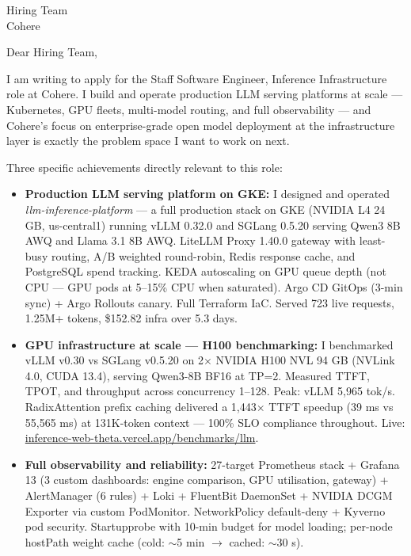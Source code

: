 \documentclass[a4paper]{letter}
\date{\today}
\begin{document}
\begin{letter}{Hiring Team \\ Cohere}

\opening{Dear Hiring Team,}

I am writing to apply for the Staff Software Engineer, Inference Infrastructure role at Cohere. I build and operate production LLM serving platforms at scale — Kubernetes, GPU fleets, multi-model routing, and full observability — and Cohere's focus on enterprise-grade open model deployment at the infrastructure layer is exactly the problem space I want to work on next.

Three specific achievements directly relevant to this role:

\begin{itemize}
  \item \textbf{Production LLM serving platform on GKE:} I designed and operated \textit{llm-inference-platform} — a full production stack on GKE (NVIDIA L4 24 GB, us-central1) running vLLM 0.32.0 and SGLang 0.5.20 serving Qwen3 8B AWQ and Llama 3.1 8B AWQ. LiteLLM Proxy 1.40.0 gateway with least-busy routing, A/B weighted round-robin, Redis response cache, and PostgreSQL spend tracking. KEDA autoscaling on GPU queue depth (not CPU — GPU pods at 5--15\% CPU when saturated). Argo CD GitOps (3-min sync) + Argo Rollouts canary. Full Terraform IaC. Served 723 live requests, 1.25M+ tokens, \$152.82 infra over 5.3 days.
  \item \textbf{GPU infrastructure at scale — H100 benchmarking:} I benchmarked vLLM v0.30 vs SGLang v0.5.20 on 2$\times$ NVIDIA H100 NVL 94 GB (NVLink 4.0, CUDA 13.4), serving Qwen3-8B BF16 at TP=2. Measured TTFT, TPOT, and throughput across concurrency 1--128. Peak: vLLM 5,965 tok/s. RadixAttention prefix caching delivered a 1,443$\times$ TTFT speedup (39 ms vs 55,565 ms) at 131K-token context — 100\% SLO compliance throughout. Live: \href{https://inference-web-theta.vercel.app/benchmarks/llm}{inference-web-theta.vercel.app/benchmarks/llm}.
  \item \textbf{Full observability and reliability:} 27-target Prometheus stack + Grafana 13 (3 custom dashboards: engine comparison, GPU utilisation, gateway) + AlertManager (6 rules) + Loki + FluentBit DaemonSet + NVIDIA DCGM Exporter via custom PodMonitor. NetworkPolicy default-deny + Kyverno pod security. Startupprobe with 10-min budget for model loading; per-node hostPath weight cache (cold: $\sim$5 min $\rightarrow$ cached: $\sim$30 s).
\end{itemize}


\end{letter}
\end{document}
